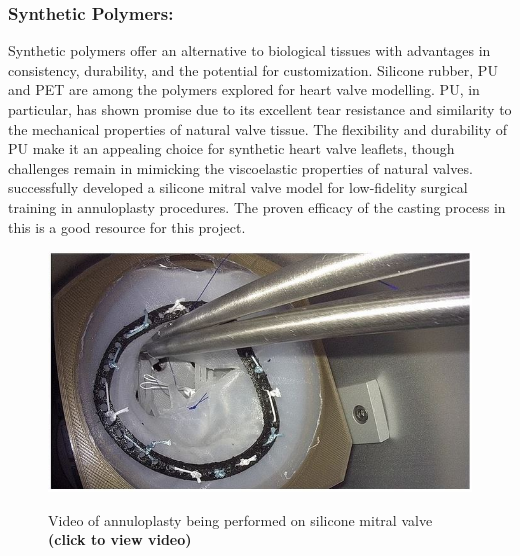 \subsubsection{Synthetic Polymers:}
Synthetic polymers offer an alternative to biological tissues with advantages in consistency, durability, and the potential for customization. Silicone rubber, \gls{PU} and \gls{PET} are among the polymers explored for heart valve modelling. \gls{PU}, in particular, has shown promise due to its excellent tear resistance and similarity to the mechanical properties of natural valve tissue. The flexibility and durability of \gls{PU} make it an appealing choice for synthetic heart valve leaflets, though challenges remain in mimicking the viscoelastic properties of natural valves. ~ 
\\
 successfully developed a silicone mitral valve model for low-fidelity surgical training in annuloplasty procedures. The proven efficacy of the casting process in this is a good resource for this project.
\begin{figure}[H]
    \centering
    \href{https://link.springer.com/article/10.1007/s11548-019-01971-9#MOESM1}{\includegraphics[width=\linewidth]{figures/Engel}}%
    \caption{Video of annuloplasty being performed on silicone mitral valve \textbf{(click to view video)}}
    \label{fig:Videoengel}
\end{figure}

